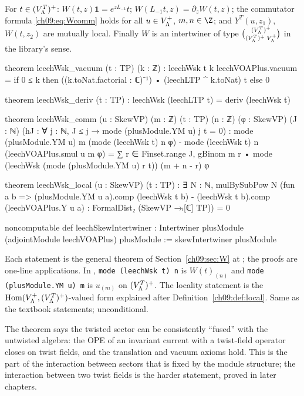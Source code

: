 \begin{theorem}\label{ch09:thm:leechW}
For $t\in(V_{\Lambda}^{T})^{+}$: $W(t,z)\mathbf1=e^{zL_{-1}}t$; $W(L_{-1}t,z)=\partial_zW(t,z)$; the
commutator formula \eqref{ch09:eq:Wcomm} holds for all $u\in V_{\Lambda}^{+}$, $m,n\in\Z$; and
$Y^T(u,z_1)$, $W(t,z_2)$ are mutually local. Finally $W$ is an intertwiner of type
$\binom{(V_{\Lambda}^{T})^{+}}{(V_{\Lambda}^{T})^{+}\;V_{\Lambda}^{+}}$ in the library's sense.
\end{theorem}
\begin{leancode}
theorem leechWsk_vacuum (t : TP) (k : ℤ) :
    leechWsk t k leechVOAPlus.vacuum
      = if 0 ≤ k then ((k.toNat.factorial : ℂ)⁻¹) • (leechLTP ^ k.toNat) t else 0

theorem leechWsk_deriv (t : TP) : leechWsk (leechLTP t) = deriv (leechWsk t)

theorem leechWsk_comm (u : SkewVP) (m : ℤ) (t : TP) (n : ℤ) (φ : SkewVP) (J : ℕ)
    (hJ : ∀ j : ℕ, J ≤ j → mode (plusModule.YM u) j t = 0) :
    mode (plusModule.YM u) m (mode (leechWsk t) n φ)
        - mode (leechWsk t) n (leechVOAPlus.smul u m φ)
      = ∑ r ∈ Finset.range J,
          gBinom m r • mode (leechWsk (mode (plusModule.YM u) r t)) (m + n - r) φ

theorem leechWsk_local (u : SkewVP) (t : TP) :
    ∃ N : ℕ, mulBySubPow N
      (fun a b => (plusModule.YM u a).comp (leechWsk t b)
        - (leechWsk t b).comp (leechVOAPlus.Y u a) : FormalDist₂ (SkewVP →ₗ[ℂ] TP)) = 0

noncomputable def leechSkewIntertwiner :
    Intertwiner plusModule (adjointModule leechVOAPlus) plusModule :=
  skewIntertwiner plusModule
\end{leancode}
\begin{dictionary}
Each statement is the general theorem of Section~\ref{ch09:sec:W} at
; the proofs are one-line applications. In
, \texttt{mode (leechWsk t) n} is $W(t)_{(n)}$ and
\texttt{mode (plusModule.YM u) m} is $u_{(m)}$ on $(V_{\Lambda}^{T})^{+}$. The locality statement is the
$\operatorname{Hom}(V_{\Lambda}^{+},(V_{\Lambda}^{T})^{+})$-valued form explained after
Definition~\ref{ch09:def:local}. Same as the textbook statements; unconditional.
\end{dictionary}
\begin{physics}
The theorem says the twisted sector can be consistently ``fused'' with the untwisted algebra: the OPE of an invariant current with a twist-field operator closes on twist fields, and the translation and vacuum axioms hold. This is the part of the interaction between sectors that is fixed by the module structure; the interaction between two twist fields is the harder statement, proved in later chapters.
\end{physics}

